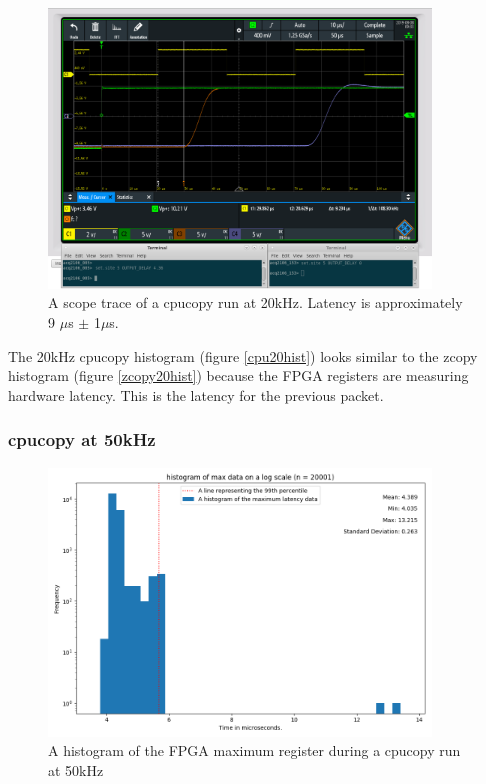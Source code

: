 \documentclass{article}
\begin{document}
\begin{figure} [htb!]
	\centering
	\includegraphics[width=4.0in]{images/20kHz_annotated_scope_cpucopy_2.png}
	\caption{A scope trace of a cpucopy run at 20kHz. Latency is approximately 9 $\mu$s $\pm$ 1$\mu$s.}
	\label{cpu20scope}
\end{figure}

The 20kHz cpucopy histogram (figure \ref{cpu20hist}) looks similar to the zcopy histogram (figure \ref{zcopy20hist}) because the FPGA registers are measuring hardware latency.
This is the latency for the previous packet.

\subsubsection{cpucopy at 50kHz}

\begin{figure} [htb!]
	\centering
	\includegraphics[width=4.0in]{images/better_images/50kHz_cpu.png}
	\caption{A histogram of the FPGA maximum register during a cpucopy run at 50kHz}
	\label{cpu50hist}
\end{figure}
\end{document}
